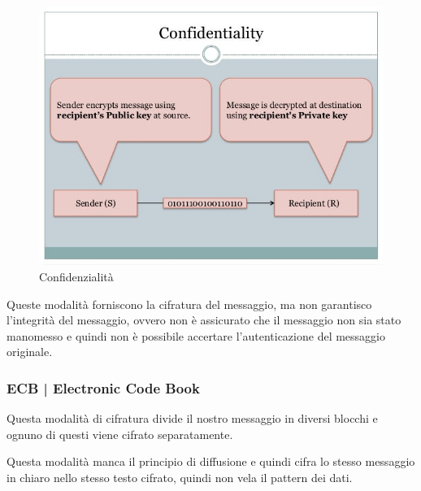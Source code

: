   

\begin{figure}[H]
	\centering
	\includegraphics[width=.9\textwidth, height=.9\textheight, keepaspectratio]{./images/aes_modes/confidentiality.png}
	\caption{Confidenzialità}
	\label{fig:confidentiality}
\end{figure}

 

\textsf{\small Queste modalità forniscono la cifratura del messaggio, ma non garantisco l'integrità del messaggio, ovvero non è assicurato che il messaggio non sia stato manomesso e quindi non è possibile accertare l'autenticazione del messaggio originale.} %

\subsubsection{ECB | Electronic Code Book}

  

\textsf{\small Questa modalità di cifratura divide il nostro messaggio in diversi blocchi e ognuno di questi viene cifrato separatamente.}


\textsf{\small Questa modalità manca il principio di diffusione e quindi cifra lo stesso messaggio in chiaro nello stesso testo cifrato, quindi non vela il pattern dei dati.} %

